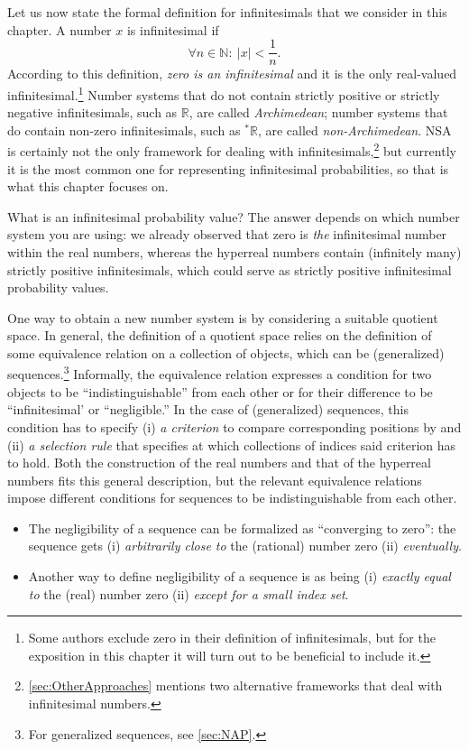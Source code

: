 Let us now state the formal definition for infinitesimals that we consider in this chapter. A number $x$ is infinitesimal if
\begin{equation}
\forall n \in \mathbb{N} : \ |x| < \frac{1}{n}.\label{eq:inf}
\end{equation}
According to this definition, \emph{zero is an infinitesimal} and it is the only real-valued infinitesimal.\footnote{Some authors exclude zero in their definition of infinitesimals, but for the exposition in this chapter it will turn out to be beneficial to include it.}
Number systems that do not contain strictly positive or strictly negative infinitesimals, such as $\mathbb{R}$, are called \emph{Archimedean}; number systems that do contain non-zero infinitesimals, such as ${^*} \mathbb{R}$, are called \emph{non-Archimedean}. NSA is certainly not the only framework for dealing with infinitesimals,\footnote{\autoref{sec:OtherApproaches} mentions two alternative frameworks that deal with infinitesimal numbers.} but currently it is the most common one for representing infinitesimal probabilities, so that is what this chapter focuses on.

What is an infinitesimal probability value? The answer depends on which number system you are using: we already observed that zero is \emph{the} infinitesimal number within the real numbers, whereas the hyperreal numbers contain (infinitely many) strictly positive infinitesimals, which could serve as strictly positive infinitesimal probability values.

One way to obtain a new number system is by considering a suitable quotient space. In general, the definition of a quotient space relies on the definition of some equivalence relation on a collection of objects, which can be  (generalized) sequences.\footnote{For generalized sequences, see \autoref{sec:NAP}.} Informally, the equivalence relation expresses a condition for two objects to be ``indistinguishable'' from each other or for their difference to be ``infinitesimal' or ``negligible.'' In the case of (generalized) sequences, this condition has to specify (i) \textit{a criterion} to compare corresponding positions by and (ii) \textit{a selection rule} that specifies at which collections of indices said criterion has to hold. Both the construction of the real numbers and that of the hyperreal numbers fits this general description, but the relevant equivalence relations impose different conditions for sequences to be indistinguishable from each other.
\begin{itemize}
  \item[(1)] The negligibility of a sequence can be formalized as ``converging to zero'': the sequence gets (i) \textit{arbitrarily close to} the (rational) number zero (ii) \textit{eventually}.
  \item[(2)] Another way to define negligibility of a sequence is as being (i) \textit{exactly equal to} the (real) number zero (ii) \textit{except for a small index set}.
\end{itemize}

